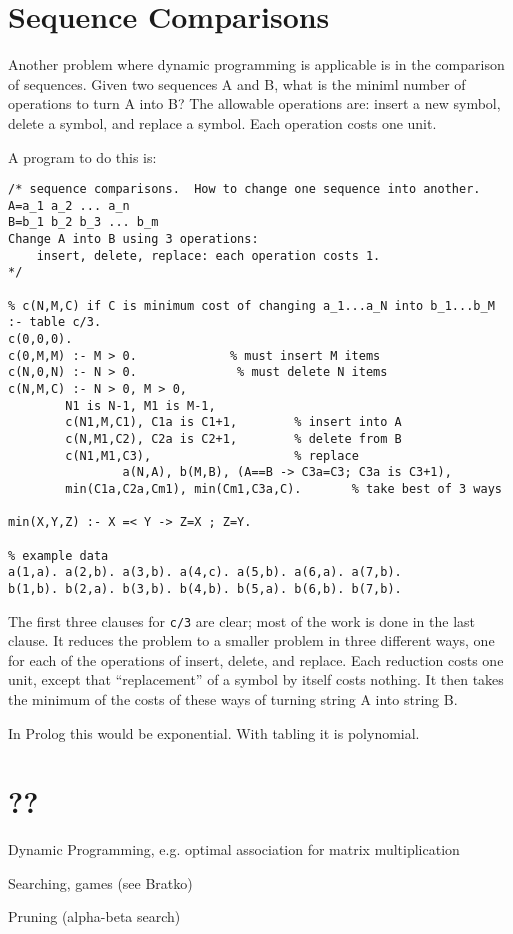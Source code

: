 \section{Sequence Comparisons}

Another problem where dynamic programming is applicable is in the
comparison of sequences.  Given two sequences A and B, what is the
miniml number of operations to turn A into B?  The allowable
operations are: insert a new symbol, delete a symbol, and replace a
symbol.  Each operation costs one unit.

A program to do this is:
\begin{verbatim}
/* sequence comparisons.  How to change one sequence into another.
A=a_1 a_2 ... a_n
B=b_1 b_2 b_3 ... b_m
Change A into B using 3 operations: 
    insert, delete, replace: each operation costs 1.
*/

% c(N,M,C) if C is minimum cost of changing a_1...a_N into b_1...b_M
:- table c/3.
c(0,0,0).
c(0,M,M) :- M > 0.             % must insert M items
c(N,0,N) :- N > 0.              % must delete N items
c(N,M,C) :- N > 0, M > 0,
        N1 is N-1, M1 is M-1, 
        c(N1,M,C1), C1a is C1+1,        % insert into A
        c(N,M1,C2), C2a is C2+1,        % delete from B
        c(N1,M1,C3),                    % replace
                a(N,A), b(M,B), (A==B -> C3a=C3; C3a is C3+1),
        min(C1a,C2a,Cm1), min(Cm1,C3a,C).       % take best of 3 ways

min(X,Y,Z) :- X =< Y -> Z=X ; Z=Y.

% example data
a(1,a). a(2,b). a(3,b). a(4,c). a(5,b). a(6,a). a(7,b).
b(1,b). b(2,a). b(3,b). b(4,b). b(5,a). b(6,b). b(7,b).
\end{verbatim}
The first three clauses for \verb|c/3| are clear; most of the work is
done in the last clause.  It reduces the problem to a smaller problem
in three different ways, one for each of the operations of insert,
delete, and replace.  Each reduction costs one unit, except that
``replacement'' of a symbol by itself costs nothing.  It then takes
the minimum of the costs of these ways of turning string A into string
B.

In Prolog this would be exponential.  With tabling it is polynomial.

\section{??}

Dynamic Programming, e.g. optimal association for matrix
multiplication

Searching, games (see Bratko)

Pruning (alpha-beta search)
